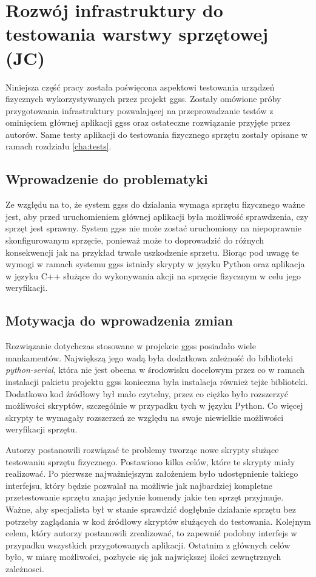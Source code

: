 \clearpage
\section{Rozwój infrastruktury do testowania warstwy sprzętowej (JC)}
\label{ch:hardware_testing}

Niniejsza część pracy została poświęcona aspektowi testowania urządzeń fizycznych wykorzystywanych przez projekt ggss. Zostały omówione próby przygotowania infrastruktury pozwalającej na przeprowadzanie testów z ominięciem głównej aplikacji ggss oraz ostateczne rozwiązanie przyjęte przez autorów. Same testy aplikacji do testowania fizycznego sprzętu zostały opisane w ramach rozdziału \ref{cha:tests}.

\subsection{Wprowadzenie do problematyki}

Ze względu na to, że system ggss do działania wymaga sprzętu fizycznego ważne jest, aby przed uruchomieniem głównej aplikacji była możliwość sprawdzenia, czy sprzęt jest sprawny. System ggss nie może zostać uruchomiony na niepoprawnie skonfigurowanym sprzęcie, ponieważ może to doprowadzić do różnych konsekwencji jak na przykład trwałe uszkodzenie sprzetu. Biorąc pod uwagę te wymogi w ramach systemu ggss istniały skrypty w języku Python oraz aplikacja w języku C++ służące do wykonywania akcji na sprzęcie fizycznym w celu jego weryfikacji.

\subsection{Motywacja do wprowadzenia zmian}

Rozwiązanie dotychczas stosowane w projekcie ggss posiadało wiele mankamentów. Największą jego wadą była dodatkowa zależność do biblioteki \emph{python-serial}, która nie jest obecna w środowisku docelowym przez co w ramach instalacji pakietu projektu ggss konieczna była instalacja również tejże biblioteki. Dodatkowo kod źródłowy był mało czytelny, przez co ciężko było rozszerzyć możliwości skryptów, szczególnie w przypadku tych w języku Python. Co więcej skrypty te wymagały rozszerzeń ze względu na swoje niewielkie możliwości weryfikacji sprzętu.

Autorzy postanowili rozwiązać te problemy tworząc nowe skrypty służące testowaniu sprzętu fizycznego. Postawiono kilka celów, które te skrypty miały realizować. Po pierwsze najważniejszym założeniem było udostępnienie takiego interfejsu, który będzie pozwalał na możliwie jak najbardziej kompletne przetestowanie sprzętu znając jedynie komendy jakie ten sprzęt przyjmuje. Ważne, aby specjalista był w stanie sprawdzić dogłębnie działanie sprzętu bez potrzeby zaglądania w kod źródłowy skryptów służących do testowania. Kolejnym celem, który autorzy postanowili zrealizować, to zapewnić podobny interfejs w przypadku wszystkich przygotowanych aplikacji. Ostatnim z głównych celów było, w miarę możliwości, pozbycie się jak największej ilości zewnętrznych zależnosci.

